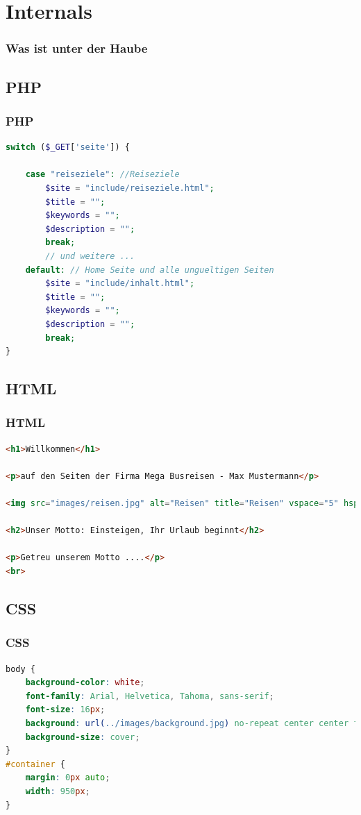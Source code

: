 \documentclass[xcolor=dvipsnames]{beamer}
\begin{document}
\section{Internals}
\begin{frame}[shrink] %
  \frametitle{Was ist unter der Haube} %
\end{frame}

\subsection{PHP}
\begin{frame}[fragile]
\frametitle{PHP}

\begin{lstlisting}[language=PHP]
switch ($_GET['seite']) {

    case "reiseziele": //Reiseziele
        $site = "include/reiseziele.html";
        $title = "";
        $keywords = "";
        $description = "";
        break;
        // und weitere ...
    default: // Home Seite und alle ungueltigen Seiten
        $site = "include/inhalt.html";
        $title = "";
        $keywords = "";
        $description = "";
        break;
}

\end{lstlisting}
\end{frame}

\subsection{HTML}
\begin{frame}[fragile]
\frametitle{HTML}

\begin{lstlisting}[language=HTML]
<h1>Willkommen</h1>

<p>auf den Seiten der Firma Mega Busreisen - Max Mustermann</p>

<img src="images/reisen.jpg" alt="Reisen" title="Reisen" vspace="5" hspace="5" align="left">

<h2>Unser Motto: Einsteigen, Ihr Urlaub beginnt</h2>

<p>Getreu unserem Motto ....</p>
<br>

\end{lstlisting}
\end{frame}

\subsection{CSS}
\begin{frame}[fragile]
\frametitle{CSS}

\begin{lstlisting}[language=CSS]
body {
    background-color: white;
    font-family: Arial, Helvetica, Tahoma, sans-serif;
    font-size: 16px;
    background: url(../images/background.jpg) no-repeat center center fixed;
    background-size: cover;
}
#container {
    margin: 0px auto;
    width: 950px;
}

\end{lstlisting}
\end{frame}
\end{document}

